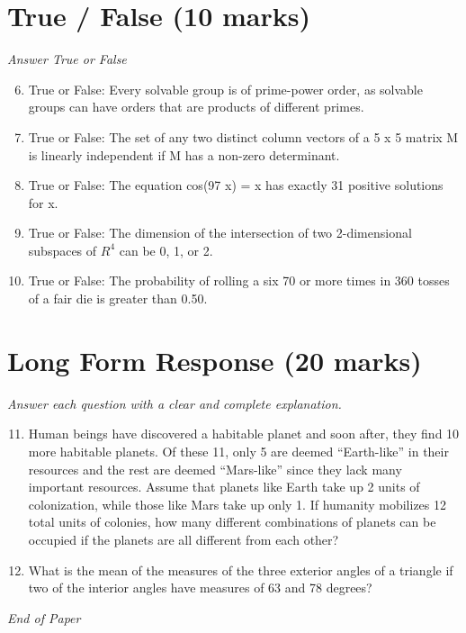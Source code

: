 \documentclass[12pt]{article}
\begin{document}
\section*{True / False (10 marks)}
\textit{Answer True or False}
\begin{enumerate}[label=\arabic*.]
\setcounter{enumi}{5}
\item True or False: Every solvable group is of prime-power order, as solvable groups can have orders that are products of different primes.
\item True or False: The set of any two distinct column vectors of a 5 x 5 matrix M is linearly independent if M has a non-zero determinant.
\item True or False: The equation cos(97 x) = x has exactly 31 positive solutions for x.
\item True or False: The dimension of the intersection of two 2-dimensional subspaces of $R^4$ can be 0, 1, or 2.
\item True or False: The probability of rolling a six 70 or more times in 360 tosses of a fair die is greater than 0.50.
\end{enumerate}

\section*{Long Form Response (20 marks)}
\textit{Answer each question with a clear and complete explanation.}
\begin{enumerate}[label=\arabic*.]
\setcounter{enumi}{10}
\item Human beings have discovered a habitable planet and soon after, they find 10 more habitable planets. Of these 11, only 5 are deemed ``Earth-like'' in their resources and the rest are deemed ``Mars-like'' since they lack many important resources. Assume that planets like Earth take up 2 units of colonization, while those like Mars take up only 1. If humanity mobilizes 12 total units of colonies, how many different combinations of planets can be occupied if the planets are all different from each other?
\item What is the mean of the measures of the three exterior angles of a triangle if two of the interior angles have measures of 63 and 78 degrees?
\end{enumerate}

\vfill
\noindent\textit{End of Paper}
\end{document}
